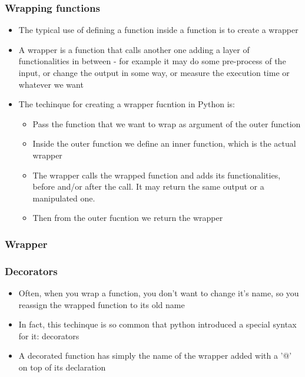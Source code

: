 \documentclass[9pt]{beamer}
\begin{document}
\begin{frame}
  \frametitle{Wrapping functions}
  \begin{itemize}
    \item The typical use of defining a function inside a function is to create
          a \alert{wrapper}
    \item A wrapper is a function that calls another one adding a layer
          of functionalities in between - for example it may do some pre-process
          of the input, or change the output in some way, or measure the 
          execution time or whatever we want
    \item The techinque for creating a wrapper fucntion in Python is:
    \begin{itemize}
       \item Pass the function that we want to wrap as argument of the outer
             function
       \item Inside the outer function we define an inner function, which is the
             actual wrapper
       \item The wrapper calls the wrapped function and adds its functionalities,
             before and/or after the call. It may return the same output or a 
             manipulated one.
       \item Then from the outer fucntion we return the wrapper
    \end{itemize}
  \end{itemize}
  
\end{frame}


\begin{frame}
  \frametitle{Wrapper}
  
\end{frame}


\begin{frame}
  \frametitle{Decorators}
  \begin{itemize}
    \item Often, when you wrap a function, you don't want to change
          it's name, so you reassign the wrapped function to its old name
    \item In fact, this techinque is so common that python introduced a special
          syntax for it: decorators
    \item A decorated function has simply the name of the wrapper added with
          a '@' on top of its declaration
  \end{itemize}
  
\end{frame}
\end{document}

